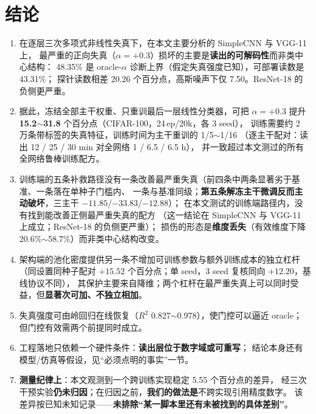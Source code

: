 \documentclass[11pt,a4paper]{ctexart}
\begin{document}
\section{结论}

\begin{enumerate}[leftmargin=2em,itemsep=2pt]
  \item 在逐层三次多项式非线性失真下，在本文主要分析的 SimpleCNN 与 VGG-11 上，
        最严重的正向失真（$\alpha=+0.3$）损坏的主要是\textbf{读出的可解码性}而非类中心结构：
        48.35\% 是 oracle-$\alpha$ 诊断上界（假定失真强度已知），可部署读数是 43.31\%；
        探针读数相差 20.26 个百分点，高斯噪声下仅 7.50。ResNet-18 的负侧更严重。
  \item 据此，冻结全部主干权重、只重训最后一层线性分类器，可把 $\alpha=+0.3$ 提升 \textbf{15.2$\sim$31.8} 个百分点（CIFAR-100，24\,ep/20k，各 3 seed），
        训练需要约 2 万条带标签的失真特征，训练时间为主干重训的 1/5$\sim$1/16
        （逐主干配对：读出 12 / 25 / 30 min 对全网络 1 / 6.5 / 6.5 h），
        并一致超过本文测过的所有全网络鲁棒训练配方。
  \item 训练端的五条补救路径没有一条改善最严重失真（前四条中两条显著劣于基准、一条落在单种子门槛内、
        一条与基准同级；\textbf{第五条解冻主干微调反而主动破坏}，三主干 $-11.85$/$-33.83$/$-12.88$）；
        在本文测试的训练端路径内，没有找到能改善正侧最严重失真的配方
        （这一结论在 SimpleCNN 与 VGG-11 上成立；ResNet-18 的负侧更严重）；
        损伤的形态是\textbf{维度丢失}（有效维度下降 20.6\%$\sim$58.7\%）而非类中心结构改变。
  \item 架构端的池化密度提供另一条不增加可训练参数与额外训练成本的独立杠杆
        （同设置同种子配对 $+15.52$ 个百分点；单 seed，3 seed 复核同向 $+12.20$，基线协议不同），
        其保护主要来自降维；两个杠杆在最严重失真上可以同时受益，但\textbf{显著次可加、不独立相加}。
  \item 失真强度可由岭回归在线恢复（$R^2$ 0.827$\sim$0.978），使门控可以逼近 oracle；
        但门控有效需两个前提同时成立。
  \item 工程落地只依赖一个硬件条件：\textbf{读出层位于数字域或可重写}；
        结论本身还有模型/仿真等假设，见“必须点明的事实”一节。
  \item \textbf{测量纪律上}：本文观测到一个跨训练实现稳定 5.55 个百分点的差异，
        经三次干预实验\textbf{仍未归因}；在归因之前，\textbf{我们的做法是}不跨实现引用精度数字。
        该差异按已知未知记录——\textbf{未排除“某一脚本里还有未被找到的具体差别”}。
\end{enumerate}
\end{document}
